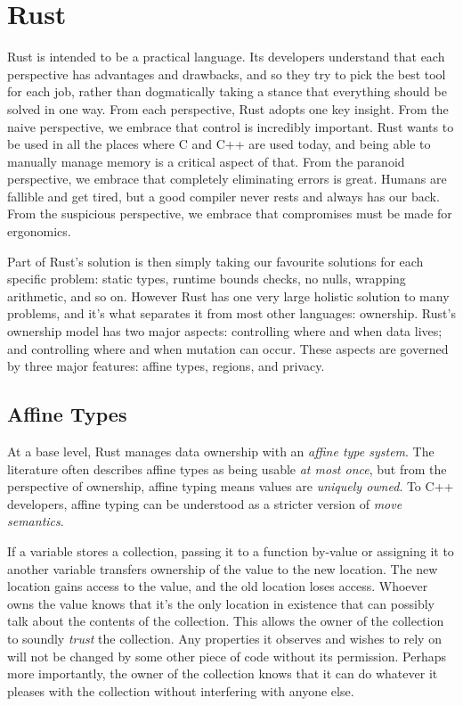 \chapter{Rust}
\label{ch:rust}

Rust is intended to be a practical language. Its developers understand that each perspective has
advantages and drawbacks, and so they try to pick the best tool for each job, rather than
dogmatically taking a stance that everything should be solved in one way. From each
perspective, Rust adopts one key insight. From the naive perspective, we embrace
that control is incredibly important. Rust wants to be used in all the places where
C and C++ are used today, and being able to manually manage memory is a critical
aspect of that. From the paranoid perspective, we embrace that completely
eliminating errors is great. Humans are fallible and get tired, but a good compiler
never rests and always has our back. From the suspicious perspective, we embrace
that compromises must be made for ergonomics.

Part of Rust's solution is then simply taking our favourite solutions for
each specific problem: static types, runtime bounds checks, no nulls, wrapping
arithmetic, and so on. However Rust has one very large holistic solution to
many problems, and it's what separates it from most other languages: ownership.
Rust's ownership model has two major aspects: controlling where and when data lives;
and controlling where and when mutation can occur. These aspects are governed by
three major features: affine types, regions, and privacy.






\section{Affine Types}

At a base level, Rust manages data ownership with an \emph{affine type system}. The
literature often describes affine types as being usable \emph{at most once}, but from
the perspective of ownership, affine typing means values are \emph{uniquely owned}.
To C++ developers, affine typing can be understood as a stricter version of
\emph{move semantics}.

If a variable stores a collection, passing it to a function by-value or
assigning it to another variable transfers ownership of the value to the new
location. The new location gains access to the value, and the old location loses
access. Whoever owns the value knows that it's the only location
in existence that can possibly talk about the contents of the collection.
This allows the owner of the collection to soundly \emph{trust} the
collection. Any properties it observes and wishes to rely on will not be changed
by some other piece of code without its permission. Perhaps more importantly,
the owner of the collection knows that it can do whatever it pleases with the
collection without interfering with anyone else.

